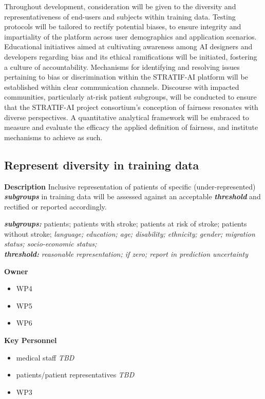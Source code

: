 \documentclass[
  letterpaper,
  DIV=11,
  numbers=noendperiod]{scrreport}
\providecommand{\tightlist}{%
  \setlength{\itemsep}{0pt}\setlength{\parskip}{0pt}}\usepackage{longtable,booktabs,array}
\begin{document}
Throughout development, consideration will be given to the diversity and
representativeness of end-users and subjects within training data.
Testing protocols will be tailored to rectify potential biases, to
ensure integrity and impartiality of the platform across user
demographics and application scenarios. Educational initiatives aimed at
cultivating awareness among AI designers and developers regarding bias
and its ethical ramifications will be initiated, fostering a culture of
accountability. Mechanisms for identifying and resolving issues
pertaining to bias or discrimination within the STRATIF-AI platform will
be established within clear communication channels. Discourse with
impacted communities, particularly at-risk patient subgroups, will be
conducted to ensure that the STRATIF-AI project consortium's conception
of fairness resonates with diverse perspectives. A quantitative
analytical framework will be embraced to measure and evaluate the
efficacy the applied definition of fairness, and institute mechanisms to
achieve as such.

\hypertarget{represent-diversity-in-training-data}{%
\subsection{Represent diversity in training
data}\label{represent-diversity-in-training-data}}

\textbf{Description} Inclusive representation of patients of specific
(under-represented) \textbf{\emph{subgroups}} in training data will be
assessed against an acceptable \textbf{\emph{threshold}} and rectified
or reported accordingly.

\textbf{\emph{subgroups:}} patients; patients with stroke; patients at
risk of stroke; patients without stroke; \emph{language; education; age;
disability; ethnicity; gender; migration status; socio-economic
status;}\\
\textbf{\emph{threshold:}} \emph{reasonable representation; if zero;
report in prediction uncertainty}

\textbf{Owner}

\begin{itemize}
\tightlist
\item
  WP4
\item
  WP5
\item
  WP6
\end{itemize}

\textbf{Key Personnel}

\begin{itemize}
\tightlist
\item
  medical staff \emph{TBD}
\item
  patients/patient representatives \emph{TBD}
\item
  WP3
\end{itemize}
\end{document}
